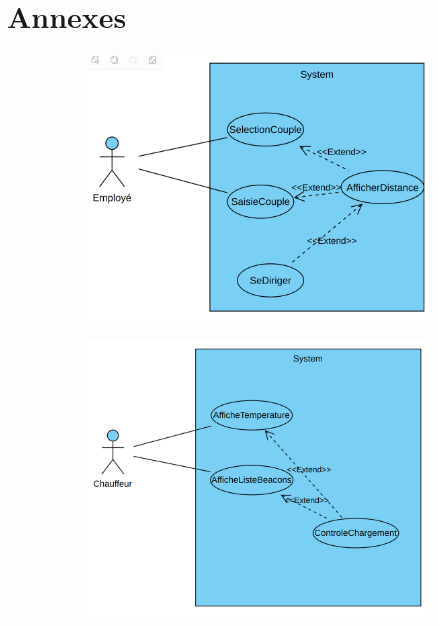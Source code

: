 \documentclass[10pt,a4paper]{article}
\begin{document}
\newpage

\section{Annexes}

\begin{figure}[h!]
    \centering
    \begin{subfigure}[b]{0.45\textwidth}
        \centering
        \includegraphics[scale=0.14]{Images/recherche-actif.png}
        \caption{}
        \label{recherche-actif.png1}
    \end{subfigure}
    \begin{subfigure}[b]{0.45\textwidth}
        \includegraphics[scale=0.14]{Images/controle-chargement.png}
        \caption{}
        \label{controle-chargement.png1}
    \end{subfigure}
    \caption{}
\end{figure}
\end{document}
